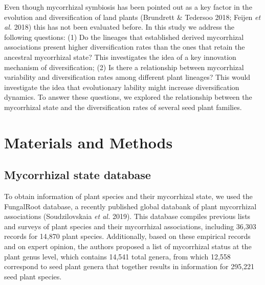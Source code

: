\documentclass[12pt,]{article}
\begin{document}
Even though mycorrhizal symbiosis has been pointed out as a key factor
in the evolution and diversification of land plants (Brundrett \&
Tedersoo 2018; Feijen \emph{et al.} 2018) this has not been evaluated
before. In this study we address the following questions: (1) Do the
lineages that established derived mycorrhizal associations present
higher diversification rates than the ones that retain the ancestral
mycorrhizal state? This investigates the idea of a key innovation
mechanism of diversification; (2) Is there a relationship between
mycorrhizal variability and diversification rates among different plant
lineages? This would investigate the idea that evolutionary lability
might increase diversification dynamics. To answer these questions, we
explored the relationship between the mycorrhizal state and the
diversification rates of several seed plant families.

\hypertarget{materials-and-methods}{%
\section{Materials and Methods}\label{materials-and-methods}}

\hypertarget{mycorrhizal-state-database}{%
\subsection{Mycorrhizal state
database}\label{mycorrhizal-state-database}}

To obtain information of plant species and their mycorrhizal state, we
used the FungalRoot database, a recently published global databank of
plant mycorrhizal associations (Soudzilovskaia \emph{et al.} 2019). This
database compiles previous lists and surveys of plant species and their
mycorrhizal associations, including 36,303 records for 14,870 plant
species. Additionally, based on these empirical records and on expert
opinion, the authors proposed a list of mycorrhizal status at the plant
genus level, which contains 14,541 total genera, from which 12,558
correspond to seed plant genera that together results in information for
295,221 seed plant species.
\end{document}
